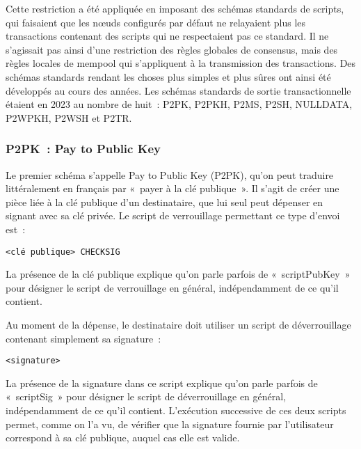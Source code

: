 Cette restriction a été appliquée en imposant des schémas standards de scripts, qui faisaient que les nœuds configurés par défaut ne relayaient plus les transactions contenant des scripts qui ne respectaient pas ce standard. Il ne s'agissait pas ainsi d'une restriction des règles globales de consensus, mais des règles locales de mempool qui s'appliquent à la transmission des transactions. Des schémas standards rendant les choses plus simples et plus sûres ont ainsi été développés au cours des années. Les schémas standards de sortie transactionnelle étaient en 2023 au nombre de huit~: P2PK, P2PKH, P2MS, P2SH, NULLDATA, P2WPKH, P2WSH et P2TR.


\subsubsection*{P2PK~: Pay to Public Key} Le premier schéma s'appelle Pay to Public Key (P2PK), qu'on peut traduire littéralement en français par «~payer à la clé publique~». Il s'agit de créer une pièce liée à la clé publique d'un destinataire, que lui seul peut dépenser en signant avec sa clé privée. Le script de verrouillage permettant ce type d'envoi est~:

\begin{Verbatim}[fontsize=\footnotesize]
<clé publique> CHECKSIG
\end{Verbatim}

La présence de la clé publique explique qu'on parle parfois de «~scriptPubKey~» pour désigner le script de verrouillage en général, indépendamment de ce qu'il contient.

Au moment de la dépense, le destinataire doit utiliser un script de déverrouillage contenant simplement sa signature~:

\begin{Verbatim}[fontsize=\footnotesize]
<signature>
\end{Verbatim}

La présence de la signature dans ce script explique qu'on parle parfois de «~scriptSig~» pour désigner le script de déverrouillage en général, indépendamment de ce qu'il contient. L'exécution successive de ces deux scripts permet, comme on l'a vu, de vérifier que la signature fournie par l'utilisateur correspond à sa clé publique, auquel cas elle est valide.

